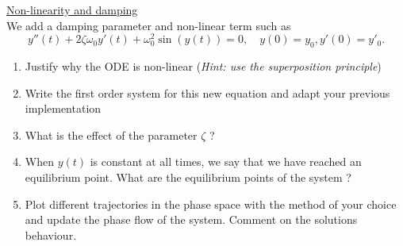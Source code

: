 \documentclass{article}
\begin{document}
 \noindent \underline{Non-linearity and damping} \\
 We add a damping parameter and non-linear term such as
 $$ y''(t) + 2 \zeta \omega_0 y'(t) + \omega_0^2 \sin(y(t)) = 0, \quad y(0)=y_0, y'(0) = y'_0. $$
 \begin{enumerate}
     \item Justify why the ODE is non-linear (\textit{Hint: use the superposition principle})
     \item Write the first order system for this new equation and adapt your previous implementation
     \item What is the effect of the parameter $\zeta$ ?
     \item When $y(t)$ is constant at all times, we say that we have reached an equilibrium point. What are the equilibrium points of the system ?
     \item Plot different trajectories in the phase space with the method of your choice and update the phase flow of the system. Comment on the solutions behaviour.
 \end{enumerate}
 
\end{document}
